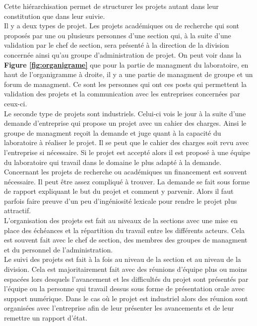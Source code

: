 \documentclass[12pt]{article}   %
\theoremstyle{plain}
\theoremstyle{remark}
\begin{document}
Cette hiérarchisation permet de structurer les projets autant dans leur constitution que dans leur suivie. \\ 
Il y a deux types de projet. Les projets académiques ou de recherche qui sont proposés par une ou plusieurs personnes d'une section qui, à la suite d'une validation par le chef de section, sera présenté à la direction de la division concernée ainsi qu'au groupe d'administration de projet. On peut voir dans la \textbf{Figure \ref{fig:organigrame}} que pour la partie de managment du laboratoire, en haut de l'organigramme à droite, il y a une partie de managment de groupe et un forum de managment. Ce sont les personnes qui ont ces posts qui permettent la validation des projets et la communication avec les entreprises concernées par ceux-ci. \\
Le seconde type de projets sont industriels. Celui-ci vois le jour à la suite d'une demande d'entreprise qui propose un projet avec un cahier des charges. Ainsi le groupe de managment reçoit la demande et juge quant à la capacité du laboratoire à réaliser le projet. Il se peut que le cahier des charges soit revu avec l'entreprise si nécessaire. Si le projet est accepté alors il est proposé à une équipe du laboratoire qui travail dans le domaine le plus adapté à la demande. \\
Concernant les projets de recherche ou académiques un financement est souvent nécessaire. Il peut être assez compliqué à trouver. La demande se fait sous forme de rapport expliquant le but du projet et comment y parvenir. Alors il faut parfois faire preuve d'un peu d'ingéniosité lexicale pour rendre le projet plus attractif. \\

L'organisation des projets est fait au niveaux de la sections avec une mise en place des échéances et la répartition du travail entre les différents acteurs. Cela est souvent fait avec le chef de section, des membres des groupes de managment et du personnel de l'administration.\\

Le suivi des projets est fait à la fois au niveau de la section et au niveau de la division. Cela est majoritairement fait avec des réunions d'équipe plus ou moins espacées lors desquels l'avancement et les difficultés du projet sont présentés par l'équipe ou la personne qui travail dessus sous forme de présentation orale avec support numérique. Dans le cas où le projet est industriel alors des réunion sont organisées avec l'entreprise afin de leur présenter les avancements et de leur remettre un rapport d'état.



\pagebreak


	
	
\end{document}
